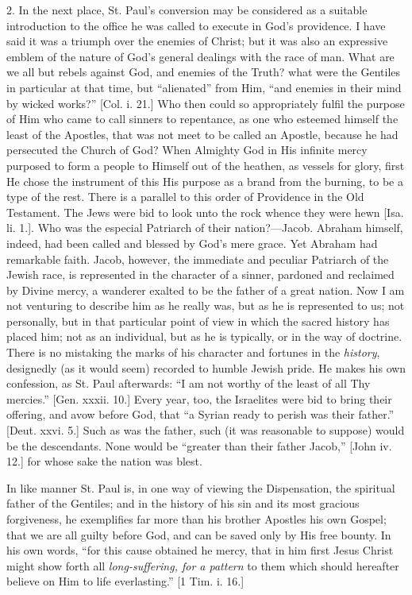2. In the next place, St. Paul's conversion may be considered as a
suitable introduction to the office he was called to execute in God's
providence. I have said it was a triumph over the enemies of Christ;
but it was also an expressive emblem of the nature of God's general
dealings with the race of man. What are we all but rebels against God,
and enemies of the Truth? what were the Gentiles in particular at that
time, but ``alienated'' from Him, ``and enemies in their
mind by wicked works?'' [Col. i. 21.] Who then could so
appropriately fulfil the purpose of Him who came to call sinners to
repentance, as one who esteemed himself the least of the Apostles,
that was not meet to be called an Apostle, because he had persecuted
the Church of God? When Almighty God in His infinite mercy purposed to
form a people to Himself out of the heathen, as vessels for glory,
first He chose the instrument of this His purpose as a brand from the
burning, to be a type of the rest. There is a parallel to this order
of Providence in the Old Testament. The Jews were bid to look unto the
rock whence they were hewn [Isa. li. 1.]. Who was the especial
Patriarch of their nation?—Jacob. Abraham himself, indeed, had been
called and blessed by God's mere grace. Yet Abraham had remarkable
faith. Jacob, however, the immediate and peculiar Patriarch of the
Jewish race, is represented in the character of a sinner, pardoned and
reclaimed by Divine mercy, a wanderer exalted to be the father of a
great nation. Now I am not venturing to describe him as he really was,
but as he is represented to us; not personally, but in that particular
point of view in which the sacred history has placed him; not as an
individual, but as he is typically, or in the way of doctrine. There
is no mistaking the marks of his character and fortunes in the \emph{history},
designedly (as it would seem) recorded to humble Jewish pride. He
makes his own confession, as St. Paul afterwards: ``I am not
worthy of the least of all Thy mercies.'' [Gen. xxxii.
10.] Every year, too, the
Israelites were bid to bring their offering, and avow before God, that
``a Syrian ready to perish was their father.'' [Deut. xxvi. 5.]
Such as was the father, such (it was reasonable to suppose) would
be the descendants. None would be ``greater than their father
Jacob,'' [John iv. 12.] for whose sake the nation was blest.

In like manner St. Paul is, in one way of viewing the Dispensation,
the spiritual father of the Gentiles; and in the history of his sin
and its most gracious forgiveness, he exemplifies far more than his
brother Apostles his own Gospel; that we are all guilty before God,
and can be saved only by His free bounty. In his own words, ``for
this cause obtained he mercy, that in him first Jesus Christ might
show forth all \emph{long-suffering, for a pattern} to them which
should hereafter believe on Him to life everlasting.'' [1 Tim. i.
16.]

